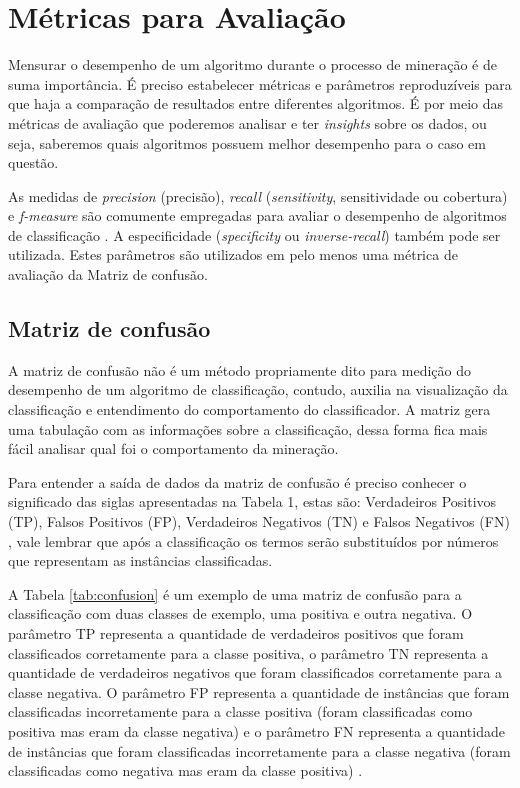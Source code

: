 \section{Métricas para Avaliação}

Mensurar o desempenho de um algoritmo durante o processo de mineração é de suma importância. É preciso estabelecer métricas e parâmetros reproduzíveis para que haja a comparação de resultados entre diferentes algoritmos. É por meio das métricas de avaliação que poderemos analisar e ter \textit{insights} sobre os dados, ou seja, saberemos quais algoritmos possuem melhor desempenho para o caso em questão.

As medidas de \textit{precision} (precisão), \textit{recall} (\textit{sensitivity}, sensitividade ou cobertura) e \textit{f-measure} são comumente empregadas para avaliar o desempenho de algoritmos de classificação \cite{Powers2011}. A especificidade  (\textit{specificity} ou  \textit{inverse-recall}) também pode ser utilizada. Estes parâmetros são utilizados em pelo menos uma métrica de avaliação da Matriz de confusão.

\subsection{Matriz de confusão}

A matriz de confusão não é um método propriamente dito para medição do desempenho de um algoritmo de classificação, contudo, auxilia na visualização da classificação \cite{Deng2016} e entendimento do comportamento do classificador. A matriz gera uma tabulação com as informações sobre a classificação, dessa forma fica mais fácil analisar qual foi o comportamento da mineração.

Para entender a saída de dados da matriz de confusão é preciso conhecer o significado das siglas apresentadas na Tabela 1, estas são: Verdadeiros Positivos (TP), Falsos Positivos (FP), Verdadeiros Negativos (TN) e Falsos Negativos (FN) \cite{Powers2011}, vale lembrar que após a classificação os termos serão substituídos por números que representam as instâncias classificadas.

A Tabela \ref{tab:confusion} é um exemplo de uma matriz de confusão para a classificação com duas classes de exemplo, uma positiva e outra negativa. O parâmetro TP representa a quantidade de verdadeiros positivos que foram classificados corretamente para a  classe positiva, o parâmetro TN representa a quantidade de verdadeiros negativos que foram classificados corretamente para a classe negativa. O parâmetro FP representa a quantidade de instâncias que foram classificadas incorretamente para a classe positiva (foram classificadas como positiva mas eram da classe negativa) e o parâmetro FN representa a quantidade de instâncias que foram classificadas incorretamente para a classe negativa (foram classificadas como negativa mas eram da classe positiva) \cite{Powers2011}.

